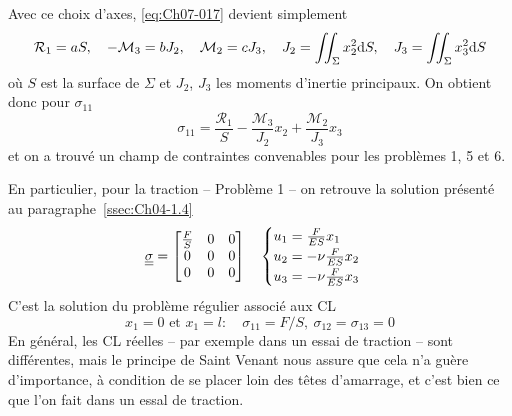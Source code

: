 Avec ce choix d'axes, \eqref{eq:Ch07-017} devient simplement
\begin{equation}
    \mathcal{R}_1 = a S, \quad -\mathcal{M}_3 = b J_2, \quad \mathcal{M}_2 = c J_3, \quad J_2 = \iint_{\Sigma} x_2^2 \mathrm{d} S, \quad J_3 = \iint_{\Sigma} x_3^2 \mathrm{d} S
    \label{eq:Ch07-021}
\end{equation}
où $S$ est la surface de $\Sigma$ et $J_2$, $J_3$ les moments d'inertie principaux.
On obtient donc pour $\sigma_{11}$
\begin{equation}
    \sigma_{11} = \frac{\mathcal{R}_1}{S} - \frac{\mathcal{M}_3}{J_2} x_2 + \frac{\mathcal{M}_2}{J_3}x_3
    \label{eq:Ch07-022}
\end{equation}
et on a trouvé un champ de contraintes convenables pour les problèmes 1, 5 et 6.

En particulier, pour la traction -- Problème 1 -- on retrouve la solution présenté au paragraphe~\ref{ssec:Ch04-1.4}
\begin{equation}
    \underline{\underline{\sigma}} = 
    \begin{bmatrix}
        \frac{F}{S} & 0 & 0 \\
        0 & 0 & 0 \\
        0 & 0 & 0
    \end{bmatrix}
    \quad
    \begin{cases}
        u_1 = \frac{F}{ES} x_1 \\
        u_2 = -\nu \frac{F}{ES} x_2 \\
        u_3 = -\nu \frac{F}{ES}  x_3
    \end{cases}
    \label{eq:Ch07-023}
\end{equation}
C'est la solution du problème régulier associé aux CL
\begin{equation}
    x_1 = 0 \text{ et } x_1 = l: \quad \sigma_{11} = F/S, \ \sigma_{12} = \sigma_{13} = 0
    \label{eq:Ch07-024}
\end{equation}
En général, les CL réelles -- par exemple dans un essai de traction -- sont différentes, mais le principe de Saint Venant nous assure que cela n'a guère d'importance, à condition de se placer loin des têtes d'amarrage, et c'est bien ce que l'on fait dans un essal de traction.

